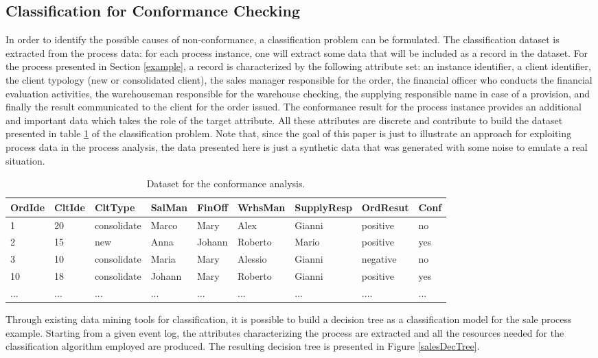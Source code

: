 \documentclass{llncs}
\begin{document}
\subsection{Classification for Conformance Checking}\label{ClassConformance}
In order to identify the possible causes of non-conformance, a classification problem can be formulated. The classification dataset is extracted from the process data: for each process instance, one will extract some data that will be included as a record in the dataset. For the process presented in Section \ref{example}, a record is characterized by the following attribute set: an instance identifier, a client identifier, the client typology (new or consolidated client), the sales manager responsible for the order, the financial officer who conducts the financial evaluation activities, the warehouseman responsible for the warehouse checking, the supplying responsible name in case of a provision, and finally the result communicated to the client for the order issued. The conformance result for the process instance provides an additional and important data which takes the role of the target attribute. All these attributes are discrete and contribute to build the dataset presented in table \ref{tab:SaleData} of the classification problem. Note that, since the goal of this paper is just to illustrate an approach for exploiting process data in the process analysis, the data presented here is just a synthetic data that was generated with some noise to emulate a real situation.

\begin{table}[!h]
\scriptsize{
\centering
\begin{tabular}{|p{1cm}|p{1cm}|p{}|p{}|p{}|p{}|p{}|p{}|p{}|}
\hline OrdIde & CltIde & CltType & SalMan & FinOff & WrhsMan & SupplyResp & OrdResut & Conf\\
\hline
1 & 20 & consolidate & Marco & Mary & Alex & Gianni & positive & no\\
\hline
2 & 15 & new & Anna & Johann & Roberto & Mario & positive & yes\\
\hline
3 & 10 &consolidate & Maria & Mary & Alessio & Gianni & negative & no\\
\hline
10 & 18 & consolidate & Johann & Mary & Roberto & Gianni & positive & yes \\
\hline
... & ... & ... & ... & ... & ... & ... & .... & ...  \\
\hline
\end{tabular}
}
\caption{Dataset for the conformance analysis.}
\label{tab:SaleData}
\end{table}
\normalsize
Through existing data mining tools for classification, it is possible to build a decision tree as a classification model for the sale process example. Starting from a given event log, the attributes characterizing the process are extracted and all the resources needed for the classification algorithm employed are produced. The resulting decision tree is presented in Figure \ref{salesDecTree}.
\end{document}
